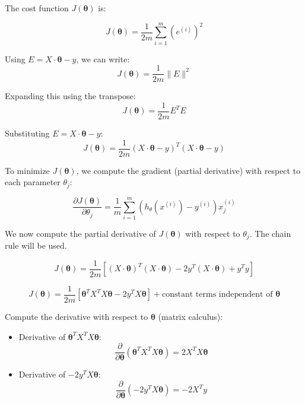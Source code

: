 The cost function \(J(\boldsymbol{\theta})\) is:

\begin{equation}
    J(\boldsymbol{\theta}) = \frac{1}{2m} \sum_{i=1}^m \left( e^{(i)} \right)^2
\end{equation}

Using \(E = X \cdot \boldsymbol{\theta} - y\), we can write:
\[
J(\boldsymbol{\theta}) = \frac{1}{2m} \|E\|^2
\]

Expanding this using the transpose:
\[
J(\boldsymbol{\theta}) = \frac{1}{2m} E^T E
\]

Substituting \(E = X \cdot \boldsymbol{\theta} - y\):
\begin{equation}
J(\boldsymbol{\theta}) = \frac{1}{2m} (X \cdot \boldsymbol{\theta} - y)^T (X \cdot \boldsymbol{\theta} - y)
\end{equation}


To minimize \(J(\boldsymbol{\theta})\), we compute the gradient (partial derivative) with respect to each
parameter \(\theta_j\):

\begin{equation}
    \frac{\partial J(\boldsymbol{\theta})}{\partial \theta_j} = \frac{1}{m} \sum_{i=1}^m \left( h_\theta(x^{(i)}) - y^{(i)} \right) x_j^{(i)}
\end{equation}

We now compute the partial derivative of \( J(\boldsymbol{\theta}) \) with respect to \( \theta_j \).
The chain rule will be used.

\[
J(\boldsymbol{\theta}) = \frac{1}{2m} \left[ (X \cdot \boldsymbol{\theta})^T (X \cdot \boldsymbol{\theta})
- 2 y^T (X \cdot \boldsymbol{\theta}) + y^T y \right]
\]

\[
J(\boldsymbol{\theta}) = \frac{1}{2m} \left[ \boldsymbol{\theta}^T X^T X \boldsymbol{\theta}
- 2 y^T X \boldsymbol{\theta} \right] + \text{constant terms independent of } \boldsymbol{\theta}
\]

Compute the derivative with respect to \( \boldsymbol{\theta} \) (matrix calculus):

\begin{itemize}
    \item Derivative of \( \boldsymbol{\theta}^T X^T X \boldsymbol{\theta} \):
    \[
     \frac{\partial}{\partial \boldsymbol{\theta}} \left( \boldsymbol{\theta}^T X^T X \boldsymbol{\theta} \right) = 2 X^T X \boldsymbol{\theta}
     \]
    \item Derivative of \( -2 y^T X \boldsymbol{\theta} \):
    \[
     \frac{\partial}{\partial \boldsymbol{\theta}} \left( -2 y^T X \boldsymbol{\theta} \right) = -2 X^T y
     \]
\end{itemize}

